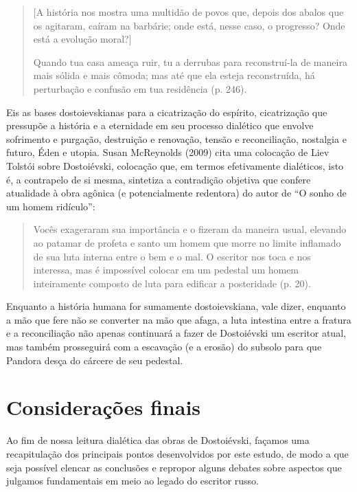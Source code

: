 \begin{quote}
{[}A história nos mostra uma multidão de povos que, depois dos abalos
que os agitaram, caíram na barbárie; onde está, nesse caso, o progresso?
Onde está a evolução moral?{]}

Quando tua casa ameaça ruir, tu a derrubas para reconstruí-la de maneira
mais sólida e mais cômoda; mas até que ela esteja reconstruída, há
perturbação e confusão em tua residência (p. 246).
\end{quote}

Eis as bases dostoievskianas para a cicatrização do espírito,
cicatrização que pressupõe a história e a eternidade em seu processo
dialético que envolve sofrimento e purgação, destruição e renovação,
tensão e reconciliação, nostalgia e futuro, Éden e utopia. Susan
McReynolds (2009) cita uma colocação de Liev Tolstói sobre Dostoiévski,
colocação que, em termos efetivamente dialéticos, isto é, a contrapelo
de si mesma, sintetiza a contradição objetiva que confere atualidade à
obra agônica (e potencialmente redentora) do autor de ``O sonho de um
homem ridículo'':

\begin{quote}
Vocês exageraram sua importância e o fizeram da maneira usual, elevando
ao patamar de profeta e santo um homem que morre no limite inflamado de
sua luta interna entre o bem e o mal. O escritor nos toca e nos
interessa, mas é impossível colocar em um pedestal um homem inteiramente
composto de luta para edificar a posteridade (p. 20).
\end{quote}

Enquanto a história humana for sumamente dostoievskiana, vale dizer,
enquanto a mão que fere não se converter na mão que afaga, a luta
intestina entre a fratura e a reconciliação não apenas continuará a
fazer de Dostoiévski um escritor atual, mas também prosseguirá com a
escavação (e a erosão) do subsolo para que Pandora desça do cárcere de
seu pedestal.

\chapter*{Considerações finais}


Ao fim de nossa leitura dialética das obras de Dostoiévski, façamos uma
recapitulação dos principais pontos desenvolvidos por este estudo, de
modo a que seja possível elencar as conclusões e repropor alguns debates
sobre aspectos que julgamos fundamentais em meio ao legado do escritor
russo.

